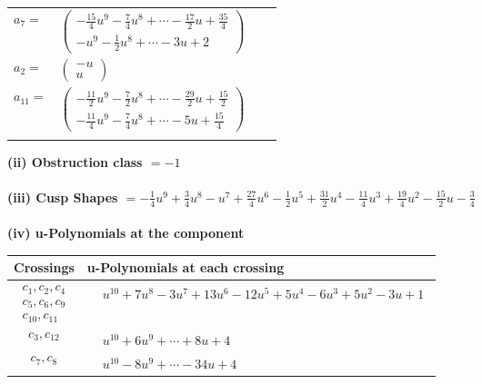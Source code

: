 \documentclass[1p]{elsarticle_modified}
\theoremstyle{definition}
\begin{document}
\begin{tabular}{m{7pt} m{180pt} m{7pt} m{180pt} }
\flushright $a_{7}=$&$\begin{pmatrix}-\frac{15}{4} u^9-\frac{7}{4} u^8+\cdots-\frac{17}{2} u+\frac{35}{4}\\- u^9-\frac{1}{2} u^8+\cdots-3 u+2\end{pmatrix}$ \\
\flushright $a_{2}=$&$\begin{pmatrix}- u\\u\end{pmatrix}$ \\
\flushright $a_{11}=$&$\begin{pmatrix}-\frac{11}{2} u^9-\frac{7}{2} u^8+\cdots-\frac{29}{2} u+\frac{15}{2}\\-\frac{11}{4} u^9-\frac{7}{4} u^8+\cdots-5 u+\frac{15}{4}\end{pmatrix}$\\&\end{tabular}
\flushleft \textbf{(ii) Obstruction class $= -1$}\\~\\
\flushleft \textbf{(iii) Cusp Shapes $= -\frac{1}{4} u^9+\frac{3}{4} u^8- u^7+\frac{27}{4} u^6-\frac{1}{2} u^5+\frac{31}{2} u^4-\frac{11}{4} u^3+\frac{19}{4} u^2-\frac{15}{2} u-\frac{3}{4}$}\\~\\
\newpage\renewcommand{\arraystretch}{1}
\flushleft \textbf{(iv) u-Polynomials at the component}\newline \\
\begin{tabular}{m{50pt}|m{274pt}}
Crossings & \hspace{64pt}u-Polynomials at each crossing \\
\hline $$\begin{aligned}c_{1},c_{2},c_{4}\\c_{5},c_{6},c_{9}\\c_{10},c_{11}\end{aligned}$$&$\begin{aligned}
&u^{10}+7 u^8-3 u^7+13 u^6-12 u^5+5 u^4-6 u^3+5 u^2-3 u+1
\end{aligned}$\\
\hline $$\begin{aligned}c_{3},c_{12}\end{aligned}$$&$\begin{aligned}
&u^{10}+6 u^9+\cdots+8 u+4
\end{aligned}$\\
\hline $$\begin{aligned}c_{7},c_{8}\end{aligned}$$&$\begin{aligned}
&u^{10}-8 u^9+\cdots-34 u+4
\end{aligned}$\\
\hline
\end{tabular}\\~\\
\end{document}
